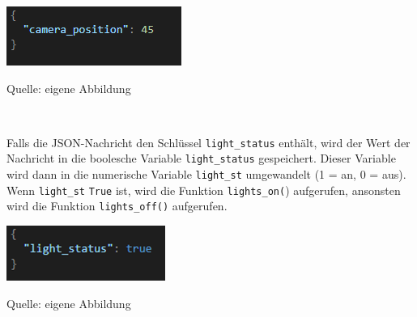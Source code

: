 \documentclass[ngerman,12pt,a4paper]{article}
\begin{document}
	\begin{center}
		\begin{minipage}[t]{0.4\textwidth}
			\includegraphics{Pictures/example-camera}
			\label{fig:example-camera}
			\vspace{-10pt}
			\begin{center}
				\par\small Quelle: eigene Abbildung 
			\end{center}
		\end{minipage} \\[0.3cm]
	\end{center}
	Falls die JSON-Nachricht den Schlüssel \texttt{light\_status} enthält, wird der Wert der Nachricht in die boolesche Variable \texttt{light\_status}  gespeichert. Dieser Variable wird dann in die numerische Variable \texttt{light\_st} umgewandelt (1 = an, 0 = aus). Wenn \texttt{light\_st} \texttt{True} ist, wird die Funktion \texttt{lights\_on(}) aufgerufen, ansonsten wird die Funktion \texttt{lights\_off()} aufgerufen.
	\begin{center}
		\begin{minipage}[t]{0.35\textwidth}
			\includegraphics{Pictures/example-light}
			\label{fig:example-light}
			\vspace{-10pt}
			\begin{center}
				\par\small Quelle: eigene Abbildung 
			\end{center}
		\end{minipage} 
	\end{center}
\end{document}

